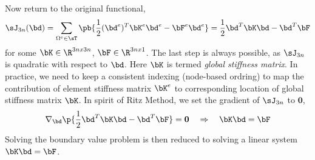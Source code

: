 \documentclass[11pt,titlepage]{article}
\begin{document}
Now return to the original functional,
\[
    \sJ_{3n}(\bd) = 
        \sum_{\Omega^e \in \sT} \pb{
            \frac{1}{2} (\bd^e)^T \bK^e \bd^e
                - \bF^e \bd^e
        }
        =
        \frac{1}{2} \bd^T \bK \bd - \bd^T \bF
\]
for some $\bK\in\R^{3nx3n}$, $\bF\in\R^{3nx1}$. The last step is always possible, as $\sJ_{3n}$ is quadratic with respect to $\bd$. Here $\bK$ is termed \textit{global stiffness matrix}. In practice, we need to keep a consistent indexing (node-based ordring) to map the contribution of element stiffness matrix $\bK^e$ to corresponding location of global stiffness matrix $\bK$. In spirit of Ritz Method, we set the gradient of $\sJ_{3n}$ to $\mathbf{0}$,
\[
    \nabla_{\bd} \p{\frac{1}{2} \bd^T \bK \bd - \bd^T \bF} = \mathbf{0}
    \quad\Rightarrow\quad
    \bK \bd = \bF
\]
Solving the boundary value problem is then reduced to solving a linear system $\bK \bd = \bF$.



\newpage
\printbibliography
\end{document}
